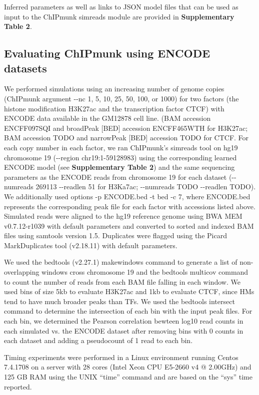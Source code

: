 \documentclass[12pt]{article}
\begin{document}
Inferred parameters as well as links to JSON model files that can be used as input to the ChIPmunk simreads module are provided in \textbf{Supplementary Table 2}.

\subsection*{Evaluating ChIPmunk using ENCODE datasets}

We performed simulations using an increasing number of genome copies (ChIPmunk argument -{}-nc 1, 5, 10, 25, 50, 100, or 1000) for two factors (the histone modification H3K27ac and the transcription factor CTCF) with ENCODE data available in the GM12878 cell line. (BAM accession ENCFF097SQI and broadPeak [BED] accession ENCFF465WTH for H3K27ac; BAM accession TODO and narrowPeak [BED] accession TODO for CTCF.
For each copy number in each factor, we ran ChIPmunk's simreads tool on hg19 chromosome 19 (-{}-region chr19:1-59128983) using the corresponding learned ENCODE model (see \textbf{Supplementary Table 2}) and the same sequencing parameters as the ENCODE reads from chromosome 19 for each dataset (-{}-numreads 269113 -{}-readlen 51 for H3Ka7ac; -{}-numreads TODO -{}-readlen TODO). 
We additionally used options -p ENCODE.bed -t bed -c 7, where ENCODE.bed represents the corresponding peak file for each factor with accessions listed above.
Simulated reads were aligned to the hg19 reference genome using BWA MEM \cite{bwamem} v0.7.12-r1039 with default parameters and converted to sorted and indexed BAM files using samtools \cite{samtools} version 1.5. Duplicates were flagged using the Picard \cite{picard} MarkDuplicates tool (v2.18.11) with default parameters.

We used the bedtools \cite{bedtools} (v2.27.1) makewindows command to generate a list of non-overlapping windows cross chromosome 19 and the bedtools multicov command to count the number of reads from each BAM file falling in each window. We used bins of size 5kb to evaluate H3K27ac and 1kb to evaluate CTCF, since HMs tend to have much broader peaks than TFs.
We used the bedtools intersect command to determine the intersection of each bin with the input peak files. For each bin, we determined the Pearson correlation bewteen log10 read counts in each simulated vs. the ENCODE dataset after removing bins with 0 counts in each dataset and adding a pseudocount of 1 read to each bin.

Timing experiments were performed in a Linux environment running Centos 7.4.1708 on a server with 28 cores (Intel\textsuperscript{\textregistered} Xeon\textsuperscript{\textregistered} CPU E5-2660 v4 @ 2.00GHz) and 125 GB RAM using the UNIX ``time'' command and are based on the ``sys'' time reported. %
\end{document}
